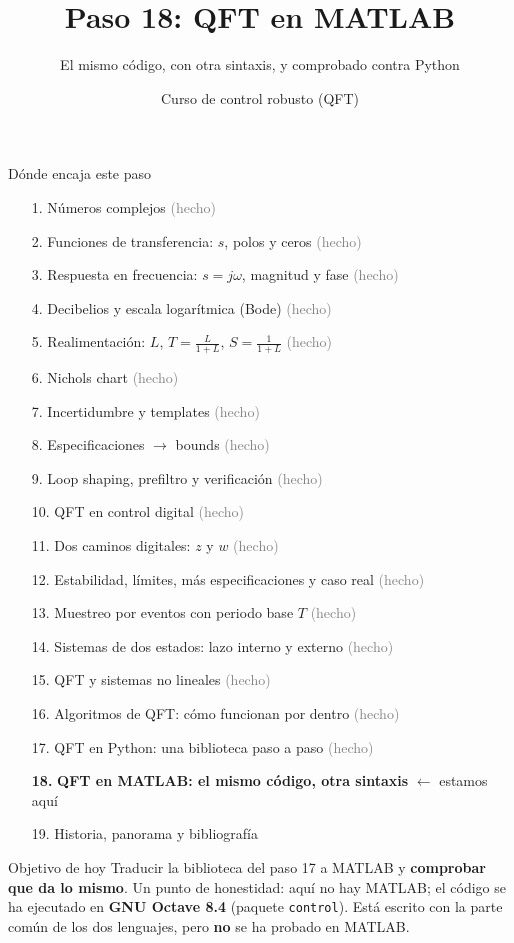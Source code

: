 \documentclass[aspectratio=169,11pt]{beamer}
\title[QFT en MATLAB]{Paso 18: QFT en MATLAB}
\subtitle{El mismo código, con otra sintaxis, y comprobado contra Python}
\author{Curso de control robusto (QFT)}
\date{}
\begin{document}
\begin{frame}\titlepage\end{frame}

\begin{frame}{Dónde encaja este paso}
  \tiny
  \begin{enumerate}\setlength{\itemsep}{-2pt}
    \item[1.] Números complejos \hfill \textcolor{gray}{(hecho)}
    \item[2.] Funciones de transferencia: $s$, polos y ceros \hfill \textcolor{gray}{(hecho)}
    \item[3.] Respuesta en frecuencia: $s=j\omega$, magnitud y fase \hfill \textcolor{gray}{(hecho)}
    \item[4.] Decibelios y escala logarítmica (Bode) \hfill \textcolor{gray}{(hecho)}
    \item[5.] Realimentación: $L$, $T=\frac{L}{1+L}$, $S=\frac{1}{1+L}$ \hfill \textcolor{gray}{(hecho)}
    \item[6.] Nichols chart \hfill \textcolor{gray}{(hecho)}
    \item[7.] Incertidumbre y templates \hfill \textcolor{gray}{(hecho)}
    \item[8.] Especificaciones $\rightarrow$ bounds \hfill \textcolor{gray}{(hecho)}
    \item[9.] Loop shaping, prefiltro y verificación \hfill \textcolor{gray}{(hecho)}
    \item[10.] QFT en control digital \hfill \textcolor{gray}{(hecho)}
    \item[11.] Dos caminos digitales: $z$ y $w$ \hfill \textcolor{gray}{(hecho)}
    \item[12.] Estabilidad, límites, más especificaciones y caso real \hfill \textcolor{gray}{(hecho)}
    \item[13.] Muestreo por eventos con periodo base $T$ \hfill \textcolor{gray}{(hecho)}
    \item[14.] Sistemas de dos estados: lazo interno y externo \hfill \textcolor{gray}{(hecho)}
    \item[15.] QFT y sistemas no lineales \hfill \textcolor{gray}{(hecho)}
    \item[16.] Algoritmos de QFT: cómo funcionan por dentro \hfill \textcolor{gray}{(hecho)}
    \item[17.] QFT en Python: una biblioteca paso a paso \hfill \textcolor{gray}{(hecho)}
    \item[\textbf{18.}] \textbf{QFT en MATLAB: el mismo código, otra sintaxis} \hfill $\leftarrow$ estamos aquí
    \item[19.] Historia, panorama y bibliografía
  \end{enumerate}
  \vspace{2pt}
  \begin{block}{Objetivo de hoy}
    \footnotesize
    Traducir la biblioteca del paso 17 a MATLAB y \textbf{comprobar que da lo mismo}. Un punto de honestidad: aquí no hay MATLAB; el código se ha ejecutado en \textbf{GNU Octave 8.4} (paquete \texttt{control}). Está escrito con la parte común de los dos lenguajes, pero \textbf{no} se ha probado en MATLAB.
  \end{block}
\end{frame}
\end{document}
